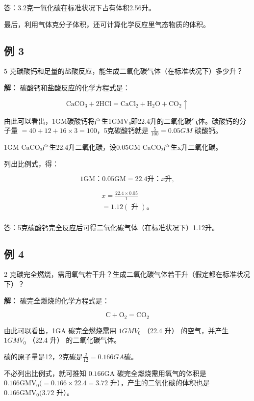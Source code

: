 答：3.2克一氧化碳在标准状况下占有体积2.56升。

最后，利用气体克分子体积，还可计算化学反应里气态物质的体积。

\subsection{例 3}

5 克碳酸钙和足量的盐酸反应，能生成二氧化碳气体（在标准状况下）多少升？

\textbf{解：} 碳酸钙和盐酸反应的化学方程式是：

\[
\mathrm{CaCO}_{3} + 2 \mathrm{HCl} = \mathrm{CaCl}_{2} + \mathrm{H}_{2} \mathrm{O} + \mathrm{CO}_{2} \uparrow
\]

由此可以看出，1GM碳酸钙将产生1GMV₀即22.4升的二氧化碳气体。碳酸钙的分子量
\(=40+12+16\times3=100\)，5克碳酸钙就是 \(\frac{5}{100}=0.05GM\)
碳酸钙。

1GM CaCO₃产生22.4升二氧化碳，设0.05GM CaCO₃产生x升二氧化碳。

列出比例式，得：

\[
1 \mathrm{GM}\text{：} 0.05 \mathrm{GM} = 22.4 \text{升}\text{：} x \text{升},
\]

\[
\begin{array}{l} x = \frac {22.4 \times 0.05}{1} \\ = 1.12 (\text{ 升 })\text{。} \\ \end{array}
\]

答：5克碳酸钙完全反应后可得二氧化碳气体（在标准状况下）1.12升。

\subsection{例 4}

2
克碳完全燃烧，需用氧气若干升？生成二氧化碳气体若干升（假定都在标准状况下）？

\textbf{解：} 碳完全燃烧的化学方程式是：

\[
\mathrm{C} + \mathrm{O}_{2} = \mathrm{CO}_{2}
\]

由此可以看出，1GA 碳完全燃烧需用 \(1GMV_{0}\) （22.4 升） 的空气，并产生
\(1GMV_{0}\) （22.4 升） 的二氧化碳气体。

碳的原子量是12，2克碳是\(\frac{2}{12}=0.166GA\)碳。

不必列出比例式，就可推知 \(0.166\mathrm{GA}\) 碳完全燃烧需用氧气的体积是
\(0.166\mathrm{GMV}_0(= 0.166\times 22.4 = 3.72\)
升），产生的二氧化碳的体积也是 \(0.166\mathrm{GMV}_0(3.72\) 升）。

